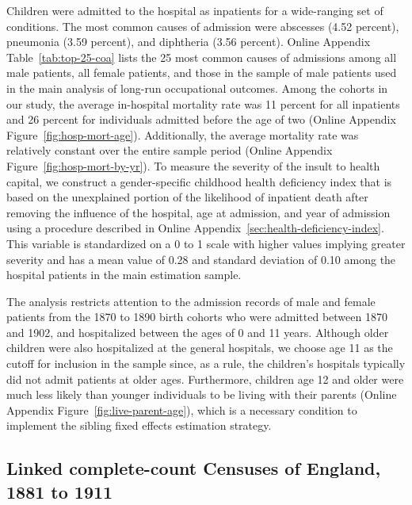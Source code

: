 \documentclass[12pt,english]{article}
\begin{document}
Children were admitted to the hospital as inpatients for a wide-ranging set of conditions. The most common causes of admission were abscesses (4.52 percent), pneumonia (3.59 percent), and diphtheria (3.56 percent). Online Appendix Table~\ref{tab:top-25-coa} lists the 25 most common causes of admissions among all male patients, all female patients, and those in the sample of male patients used in the main analysis of long-run occupational outcomes. Among the cohorts in our study, the average in-hospital mortality rate was 11 percent for all inpatients and 26 percent for individuals admitted before the age of two (Online Appendix Figure~\ref{fig:hosp-mort-age}). Additionally, the average mortality rate was relatively constant over the entire sample period (Online Appendix Figure~\ref{fig:hosp-mort-by-yr}). To measure the severity of the insult to health capital, we construct a gender-specific childhood health deficiency index that is based on the unexplained portion of the likelihood of inpatient death after removing the influence of the hospital, age at admission, and year of admission using a procedure described in Online Appendix~\ref{sec:health-deficiency-index}. This variable is standardized on a 0 to 1 scale with higher values implying greater severity and has a mean value of 0.28 and standard deviation of 0.10 among the hospital patients in the main estimation sample. 

The analysis restricts attention to the admission records of male and female patients from the 1870 to 1890 birth cohorts who were admitted between 1870 and 1902, and hospitalized between the ages of 0 and 11 years. Although older children were also hospitalized at the general hospitals, we choose age 11 as the cutoff for inclusion in the sample since, as a rule, the children's hospitals typically did not admit patients at older ages. Furthermore, children age 12 and older were much less likely than younger individuals to be living with their parents (Online Appendix Figure~\ref{fig:live-parent-age}), which is a necessary condition to implement the sibling fixed effects estimation strategy.

\subsection[Linked census data]{Linked complete-count Censuses of England, 1881 to 1911\label{subsec:census-data}}
\end{document}
